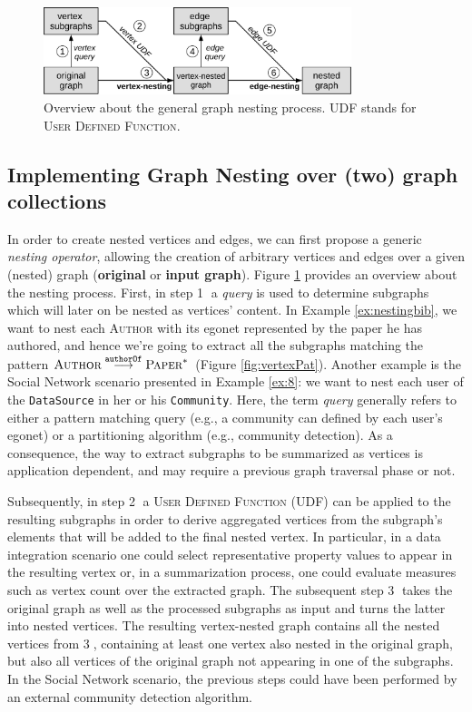 \begin{figure}[!t]
	\centering
	\includegraphics[width=0.8\textwidth]{fig/06nesting/overview.pdf}
	\caption{Overview about the general graph nesting process. UDF stands for \textsc{User Defined Function}.}
	\label{fig:process}
\end{figure}
\subsection{Implementing Graph Nesting over (two) graph collections}\label{subsec:polyovergraph}
In order to create nested vertices and edges, we can first propose a generic \textit{nesting operator}, allowing the creation of arbitrary vertices and edges over a given (nested) graph (\textbf{original} or \textbf{input graph}). Figure \ref{fig:process} provides an overview about the nesting process. First, in step \textcircled{\raisebox{-.5pt}1} a \textit{query} is used to determine subgraphs which will later on be nested as vertices' content. In Example \vref{ex:nestingbib}, we want to nest each \textsc{Author} with its egonet represented by the paper he has authored, and hence we're going to extract all the subgraphs matching the pattern $\textsc{Author}\overset{\texttt{authorOf}}{\longrightarrow}\textsc{Paper}^*$ (Figure \ref{fig:vertexPat}). Another example is the Social Network scenario presented in Example \vref{ex:8}: we want to nest each user of the \texttt{DataSource} in her or his \texttt{Community}. Here, the term \textit{query} generally refers to either a pattern matching query (e.g., a community can defined by each user's egonet) or a partitioning algorithm (e.g., community detection). As a consequence, the way to extract subgraphs to be summarized as vertices is application dependent, and may require a previous graph traversal phase or not.


%
Subsequently, in step \textcircled{\raisebox{-.5pt}2} a \textsc{User Defined Function} (UDF) can be applied to the resulting subgraphs in order to derive aggregated vertices from the subgraph's elements that will be added to the final nested vertex. In particular, in a data integration scenario one could select representative property values to appear in the resulting vertex or, in a summarization process, one could evaluate measures such as vertex count over the extracted graph. The subsequent step \textcircled{\raisebox{-.5pt}3} takes the original graph as well as the processed subgraphs as input and turns the latter into nested vertices. The resulting vertex-nested graph contains all the nested vertices from \textcircled{\raisebox{-.5pt}3}, containing at least one vertex also nested in the original graph, but also all vertices of the original graph not appearing in one of the subgraphs. In the Social Network scenario, the previous steps could have been performed by an external community detection algorithm. 

